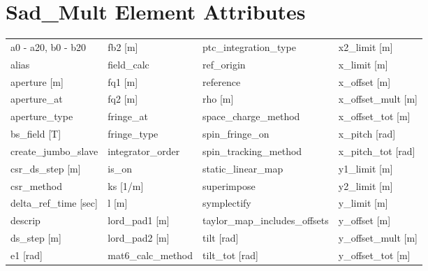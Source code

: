  \section{Sad_Mult Element Attributes}
 \label{s:list.sad.mult}
 
 \begin{tabular}{llll} \toprule
a0 - a20, b0 - b20               & fb2 [m]                          & ptc_integration_type             & x2_limit [m]                     \\
alias                            & field_calc                       & ref_origin                       & x_limit [m]                      \\
aperture [m]                     & fq1 [m]                          & reference                        & x_offset [m]                     \\
aperture_at                      & fq2 [m]                          & rho [m]                          & x_offset_mult [m]                \\
aperture_type                    & fringe_at                        & space_charge_method              & x_offset_tot [m]                 \\
bs_field [T]                     & fringe_type                      & spin_fringe_on                   & x_pitch [rad]                    \\
create_jumbo_slave               & integrator_order                 & spin_tracking_method             & x_pitch_tot [rad]                \\
csr_ds_step [m]                  & is_on                            & static_linear_map                & y1_limit [m]                     \\
csr_method                       & ks [1/m]                         & superimpose                      & y2_limit [m]                     \\
delta_ref_time [sec]             & l [m]                            & symplectify                      & y_limit [m]                      \\
descrip                          & lord_pad1 [m]                    & taylor_map_includes_offsets      & y_offset [m]                     \\
ds_step [m]                      & lord_pad2 [m]                    & tilt [rad]                       & y_offset_mult [m]                \\
e1 [rad]                         & mat6_calc_method                 & tilt_tot [rad]                   & y_offset_tot [m]                 \\

\end{tabular}
